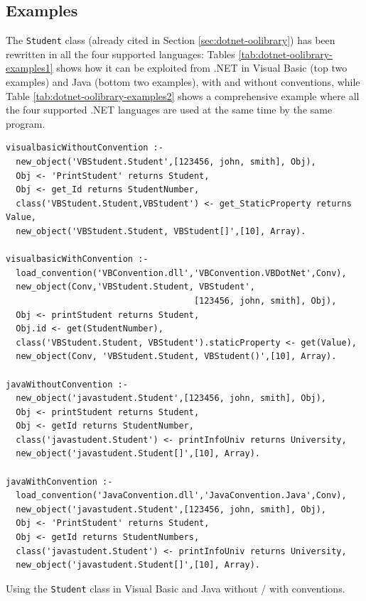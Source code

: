 \subsection{Examples}
\label{sec:dotnet-oolibrary-examples}


The \texttt{Student} class (already cited in Section \ref{sec:dotnet-oolibrary}) has been rewritten in all the four supported languages:
Tables \ref{tab:dotnet-oolibrary-examples1} shows how it can be exploited from \tuprolog{}.NET in Visual Basic (top two examples) and Java (bottom two examples), with and without conventions, while Table \ref{tab:dotnet-oolibrary-examples2} shows a comprehensive example where all the four supported .NET languages are used at the same time by the same \tuprolog{} program.

\begin{table}
{\small
\begin{verbatim}
visualbasicWithoutConvention :-
  new_object('VBStudent.Student',[123456, john, smith], Obj),
  Obj <- 'PrintStudent' returns Student,
  Obj <- get_Id returns StudentNumber,
  class('VBStudent.Student,VBStudent') <- get_StaticProperty returns Value,
  new_object('VBStudent.Student, VBStudent[]',[10], Array).

visualbasicWithConvention :-
  load_convention('VBConvention.dll','VBConvention.VBDotNet',Conv),
  new_object(Conv,'VBStudent.Student, VBStudent',
                                     [123456, john, smith], Obj),
  Obj <- printStudent returns Student,
  Obj.id <- get(StudentNumber),
  class('VBStudent.Student, VBStudent').staticProperty <- get(Value),
  new_object(Conv, 'VBStudent.Student, VBStudent()',[10], Array).

javaWithoutConvention :-
  new_object('javastudent.Student',[123456, john, smith], Obj),
  Obj <- printStudent returns Student,
  Obj <- getId returns StudentNumber,
  class('javastudent.Student') <- printInfoUniv returns University,
  new_object('javastudent.Student[]',[10], Array).

javaWithConvention :-
  load_convention('JavaConvention.dll','JavaConvention.Java',Conv),
  new_object('javastudent.Student',[123456, john, smith], Obj),
  Obj <- 'PrintStudent' returns Student,
  Obj <- getId returns StudentNumbers,
  class('javastudent.Student') <- printInfoUniv returns University,
  new_object('javastudent.Student[]',[10], Array).
\end{verbatim}
}
  \caption{Using the \texttt{Student} class in Visual Basic and Java without / with conventions.}
  \label{tab:dotnet-oolibrary-examples1}
\end{table}

